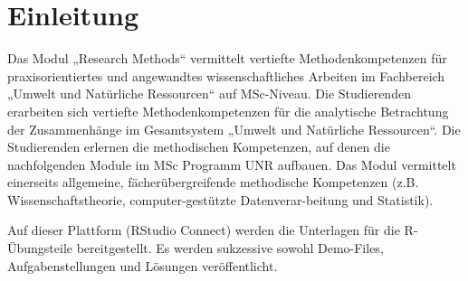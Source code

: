 \documentclass[]{book}
\begin{document}
{
\setcounter{tocdepth}{1}
\tableofcontents
}
\chapter{Einleitung}\label{einleitung}

Das Modul „Research Methods`` vermittelt vertiefte Methodenkompetenzen
für praxisorientiertes und angewandtes wissenschaftliches Arbeiten im
Fachbereich „Umwelt und Natürliche Ressourcen`` auf MSc-Niveau. Die
Studierenden erarbeiten sich vertiefte Methodenkompetenzen für die
analytische Betrachtung der Zusammenhänge im Gesamtsystem „Umwelt und
Natürliche Ressourcen``. Die Studierenden erlernen die methodischen
Kompetenzen, auf denen die nachfolgenden Module im MSc Programm UNR
aufbauen. Das Modul vermittelt einerseits allgemeine,
fächerübergreifende methodische Kompetenzen (z.B. Wissenschaftstheorie,
computer-gestützte Datenverar-beitung und Statistik).

Auf dieser Plattform (RStudio Connect) werden die Unterlagen für die
R-Übungsteile bereitgestellt. Es werden sukzessive sowohl Demo-Files,
Aufgabenstellungen und Lösungen veröffentlicht.
\end{document}
